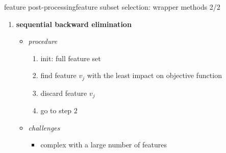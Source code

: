 \begin{frame}{feature post-processing}{feature subset selection: wrapper methods 2/2}
\begin{enumerate}
				\bigskip
                \item<6->	\textbf{sequential backward elimination}
                    \begin{itemize}
                        \item   \textit{procedure}
                            \begin{enumerate}
                                \item	init: full feature set
                                \item<7->	find feature $v_j$ with the least impact on objective function
                                \item<8->	discard feature $v_j$
                                \item<9->	go to step $2$
                            \end{enumerate}
                        \item<10->   \textit{challenges}
                            \begin{itemize}
                                \item	complex with a large number of features
                            \end{itemize}
                    \end{itemize}
			\end{enumerate}
		\end{frame}
